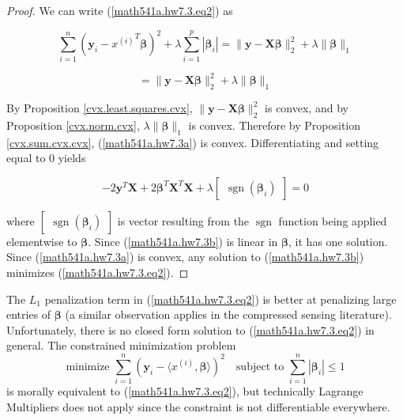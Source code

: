 \begin{proof} 

We can write (\ref{math541a.hw7.3.eq2}) as

\[
\sum_{i=1}^{n}\left(\boldsymbol{y}_{i}-{x^{(i)}}^T\boldsymbol{\beta} \right )^{2}+\lambda \sum_{i=1}^p |\boldsymbol{\beta}_i| = \lVert \boldsymbol{y} - \boldsymbol{X}\boldsymbol{\beta}\rVert_2^2+\lambda \lVert \boldsymbol{\beta}\rVert_1 
\]

\begin{equation}\label{math541a.hw7.3a}
= \lVert \boldsymbol{y} - \boldsymbol{X}\boldsymbol{\beta}\rVert_2^2+ \lambda \lVert \boldsymbol{\beta}\rVert_1 
\end{equation}

By Proposition \ref{cvx.least.squares.cvx}, \( \lVert \boldsymbol{y} - \boldsymbol{X}\boldsymbol{\beta}\rVert_2^2\) is convex, and by Proposition \ref{cvx.norm.cvx}, \(\lambda  \lVert \boldsymbol{\beta}\rVert_1 \) is convex. Therefore by Proposition \ref{cvx.sum.cvx.cvx}, (\ref{math541a.hw7.3a}) is convex. Differentiating and setting equal to 0 yields

\begin{equation}\label{math541a.hw7.3b}
-2\boldsymbol{y}^T\boldsymbol{X} + 2\boldsymbol{\beta}^T \boldsymbol{X}^T\boldsymbol{X} + \lambda \begin{bmatrix} \operatorname{sgn}(\boldsymbol{\beta}_i) \end{bmatrix} = 0
\end{equation}

where \(\begin{bmatrix} \operatorname{sgn}(\boldsymbol{\beta}_i) \end{bmatrix}\) is vector resulting from the \(\operatorname{sgn}\) function being applied elementwise to \(\boldsymbol{\beta}\). Since (\ref{math541a.hw7.3b}) is linear in \(\boldsymbol{\beta}\), it has one solution. Since (\ref{math541a.hw7.3a}) is convex, any solution to (\ref{math541a.hw7.3b}) minimizes (\ref{math541a.hw7.3.eq2}).


\end{proof}

\begin{remark}
The $L_{1}$ penalization term in (\ref{math541a.hw7.3.eq2}) is better at penalizing large entries of $\boldsymbol{\beta}$ (a similar observation applies in the compressed sensing literature).  Unfortunately, there is no closed form solution to (\ref{math541a.hw7.3.eq2}) in general.  The constrained minimization problem
$$\mbox{minimize}\,\,\sum_{i=1}^{n}(\boldsymbol{y}_{i}-\langle x^{(i)},\boldsymbol{\beta}\rangle)^{2}\quad \mbox{subject}\,\,\mbox{to}\,\,\sum_{i=1}^{n}|\boldsymbol{\beta}_{i}|\leq 1$$
is morally equivalent to (\ref{math541a.hw7.3.eq2}), but technically Lagrange Multipliers does not apply since the constraint is not differentiable everywhere.

\end{remark}

